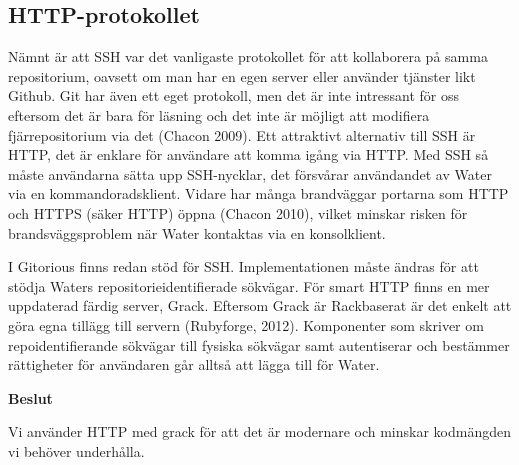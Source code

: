\subsection{HTTP-protokollet}
Nämnt är att SSH var det vanligaste protokollet för att kollaborera på samma repositorium, oavsett om man har en egen server eller använder tjänster likt Github. Git har även ett eget protokoll, men det är inte intressant för oss eftersom det är bara för läsning och det inte är möjligt att modifiera fjärrepositorium via det (Chacon 2009). Ett attraktivt alternativ till SSH är HTTP, det är enklare för användare att komma igång via HTTP.  Med SSH så måste användarna sätta upp SSH-nycklar, det försvårar användandet av Water via en kommandoradsklient.  Vidare har många brandväggar portarna som HTTP och HTTPS (säker HTTP) öppna (Chacon 2010), vilket minskar risken för brandsväggsproblem när Water kontaktas via en konsolklient.

I Gitorious finns redan stöd för SSH. Implementationen måste ändras för att stödja Waters repositorieidentifierade sökvägar. För smart HTTP finns en mer uppdaterad färdig server, Grack.  Eftersom Grack är Rackbaserat är det enkelt att göra egna tillägg till servern (Rubyforge, 2012). Komponenter som skriver om repoidentifierande sökvägar till fysiska sökvägar samt autentiserar och bestämmer rättigheter för användaren går alltså att lägga till för Water.

\begin{flushright}
  
  \textbf{Beslut}
  
  Vi använder HTTP med grack för att det är modernare och minskar kodmängden vi behöver underhålla.
  
\end{flushright}
